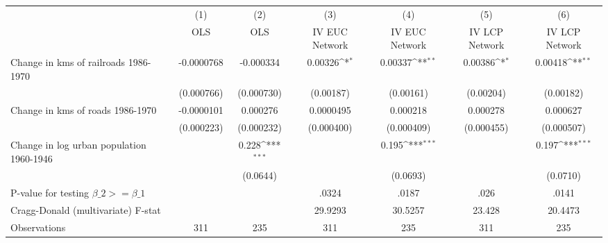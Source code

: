 {
\def\sym#1{\ifmmode^{#1}\else\(^{#1}\)\fi}
\begin{tabular}{l*{6}{c}}
\hline\hline
                &\multicolumn{1}{c}{(1)}&\multicolumn{1}{c}{(2)}&\multicolumn{1}{c}{(3)}&\multicolumn{1}{c}{(4)}&\multicolumn{1}{c}{(5)}&\multicolumn{1}{c}{(6)}\\
                &\multicolumn{1}{c}{OLS}&\multicolumn{1}{c}{OLS}&\multicolumn{1}{c}{IV EUC Network}&\multicolumn{1}{c}{IV EUC Network}&\multicolumn{1}{c}{IV LCP Network}&\multicolumn{1}{c}{IV LCP Network}\\
\hline
Change in kms of railroads 1986-1970&-0.0000768         &-0.000334         &  0.00326\sym{*}  &  0.00337\sym{**} &  0.00386\sym{*}  &  0.00418\sym{**} \\
                &(0.000766)         &(0.000730)         &(0.00187)         &(0.00161)         &(0.00204)         &(0.00182)         \\
[1em]
Change in kms of roads 1986-1970&-0.0000101         & 0.000276         &0.0000495         & 0.000218         & 0.000278         & 0.000627         \\
                &(0.000223)         &(0.000232)         &(0.000400)         &(0.000409)         &(0.000455)         &(0.000507)         \\
[1em]
Change in log urban population 1960-1946&                  &    0.228\sym{***}&                  &    0.195\sym{***}&                  &    0.197\sym{***}\\
                &                  & (0.0644)         &                  & (0.0693)         &                  & (0.0710)         \\
\hline
P-value for testing $\beta\_{2} >= \beta\_{1}$&                  &                  &    .0324         &    .0187         &     .026         &    .0141         \\
Cragg-Donald (multivariate) F-stat&                  &                  &  29.9293         &  30.5257         &   23.428         &  20.4473         \\
Observations    &      311         &      235         &      311         &      235         &      311         &      235         \\
\hline\hline
\end{tabular}
}
